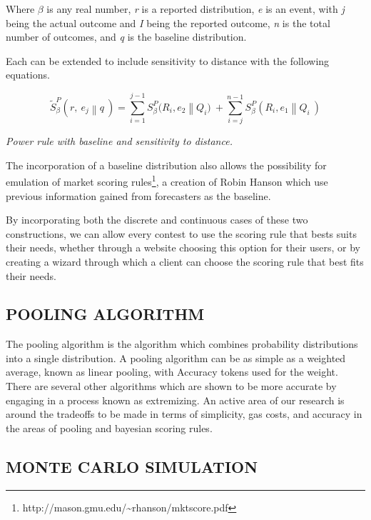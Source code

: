 Where \(\beta\) is any real number, \emph{r} is a reported distribution,
\emph{e} is an event, with \emph{j} being the actual outcome and
\emph{I} being the reported outcome, \emph{n} is the total number of
outcomes, and \emph{q} is the baseline distribution.

Each can be extended to include sensitivity to distance with the
following equations.

\[{\tilde{S}}_{\beta}^{P}(r,\ e_{j}\left\| q \right.\ ) = \sum_{i = 1}^{j - 1}S_{\beta}^{P}(R_{i},e_{2}\left\| Q_{i}) \right.\  + \sum_{i = j}^{n - 1}{S_{\beta}^{P}(R_{i},e_{1}\left\| Q_{i} \right.\ )}\]

\emph{Power rule with baseline and sensitivity to distance.}

The incorporation of a baseline distribution also allows the possibility
for emulation of market scoring rules\footnote{http://mason.gmu.edu/\textasciitilde{}rhanson/mktscore.pdf},
a creation of Robin Hanson which use previous information gained from
forecasters as the baseline.

By incorporating both the discrete and continuous cases of these two
constructions, we can allow every contest to use the scoring rule that
bests suits their needs, whether through a website choosing this option
for their users, or by creating a wizard through which a client can
choose the scoring rule that best fits their needs.

\subsection{\texorpdfstring{\protect\hypertarget{_egxt3ibmcbt9}{}{\protect\hypertarget{_Toc462050443}{}{}}POOLING
ALGORITHM}{POOLING ALGORITHM}}\label{pooling-algorithm}

The pooling algorithm is the algorithm which combines probability
distributions into a single distribution. A pooling algorithm can be as
simple as a weighted average, known as linear pooling, with Accuracy
tokens used for the weight. There are several other algorithms which are
shown to be more accurate by engaging in a process known as extremizing.
An active area of our research is around the tradeoffs to be made in
terms of simplicity, gas costs, and accuracy in the areas of pooling and
bayesian scoring rules.

\subsection{\texorpdfstring{\protect\hypertarget{_555qizcujp4j}{}{\protect\hypertarget{_Toc462050444}{}{}}MONTE
CARLO SIMULATION}{MONTE CARLO SIMULATION}}\label{monte-carlo-simulation}

